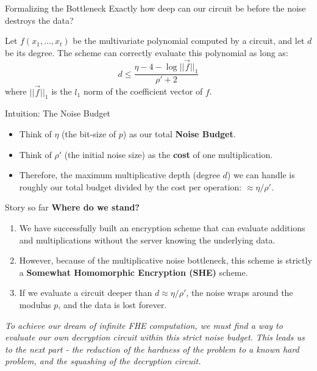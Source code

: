 \documentclass[10pt]{beamer}
\begin{document}
\begin{frame}{Formalizing the Bottleneck}
    Exactly how deep can our circuit be before the noise destroys the data?
    \pause
    
    \begin{lemma}
    Let $f(x_1, \dots, x_t)$ be the multivariate polynomial computed by a circuit, and let $d$ be its degree. The scheme can correctly evaluate this polynomial as long as:
    $$d \le \frac{\eta - 4 - \log||\vec{f}||_1}{\rho' + 2}$$
    where $||\vec{f}||_1$ is the $l_1$ norm of the coefficient vector of $f$.
    \end{lemma}
    \pause
    
    \begin{block}{Intuition: The Noise Budget}
    \begin{itemize}
        \item Think of $\eta$ (the bit-size of $p$) as our total \textbf{Noise Budget}.
        \item Think of $\rho'$ (the initial noise size) as the \textbf{cost} of one multiplication.
        \item Therefore, the maximum multiplicative depth (degree $d$) we can handle is roughly our total budget divided by the cost per operation: $\approx \eta / \rho'$.
    \end{itemize}
    \end{block}
\end{frame}

\begin{frame}{Story so far}
    \textbf{Where do we stand?}
    \pause
    
    \begin{enumerate}
        \item We have successfully built an encryption scheme that can evaluate additions and multiplications without the server knowing the underlying data.
        \pause
        \item However, because of the multiplicative noise bottleneck, this scheme is strictly a \textbf{Somewhat Homomorphic Encryption (SHE)} scheme.
        \pause
        \item If we evaluate a circuit deeper than $d \approx \eta / \rho'$, the noise wraps around the modulus $p$, and the data is lost forever.
    \end{enumerate}
    \pause
    
    \vspace{0.5cm}
    \begin{center}
        \textit{To achieve our dream of infinite FHE computation, we must find a way to evaluate our own decryption circuit within this strict noise budget. This leads us to the next part - the reduction of the hardness of the problem to a known hard problem, and the squashing of the decryption circuit.}
    \end{center}
\end{frame}
\end{document}
